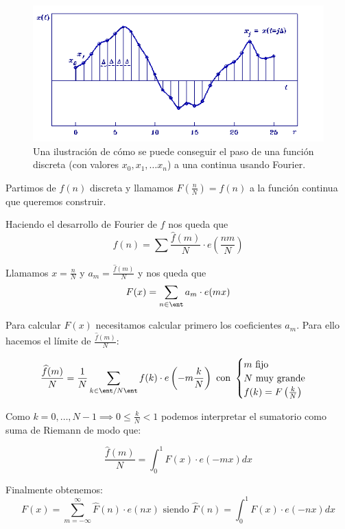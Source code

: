 \begin{figure}[hbtp]
\centering
\includegraphics[width=\linewidth]{img/fourier_discreta_a_continua.png}
\caption{Una ilustración de cómo se puede conseguir el paso de una función discreta (con valores $x_0, x_1, \dotsc x_n$) a una continua usando Fourier.}
\end{figure}

Partimos de $f(n)$ discreta y llamamos $F\left(\frac{n}{N}\right) = f(n)$ a la función continua que queremos construir.


Haciendo el desarrollo de Fourier de $f$ nos queda que
\[ f(n) = \sum \frac{\widehat{f}(m)}{N} \cdot e\left(\frac{nm}{N}\right) \]

Llamamos $x = \frac{n}{N}$ y $a_m= \frac{\widehat{f}(m)}{N}$ y nos queda que
\[ F(x) = \sum_{n\in \ent } a_m \cdot e(mx) \]

Para calcular $F(x)$ necesitamos calcular primero los coeficientes $a_m$. Para ello hacemos el límite de $\frac{\widehat{f}(m)}{N}$:

\[ \frac{\widehat{f}(m)}{N} = \frac{1}{N} \sum_{k \in \ent/N\ent} f(k) \cdot e\left(-m \frac{k}{N}\right) \text{ con } \begin{cases}
	m \text{ fijo}\\
	N \text{ muy grande}\\
	f(k) = F\left(\frac{k}{N}\right)\\
\end{cases} \]

Como $ k = 0 , \ldots , N-1 \implies 0\leq \frac{k}{N} < 1$ podemos interpretar el sumatorio como suma de Riemann de modo que:

$$\frac{\widehat{f}(m)}{N} = \int_{0}^{1} F(x) \cdot e(-mx) dx$$

Finalmente obtenemos:
$$F(x) = \sum_{m= -\infty}^{\infty} \widehat{F}(n) \cdot e(nx) \text{ siendo } \widehat{F}(n) = \int_{0}^{1} F(x) \cdot e(-nx) dx$$

